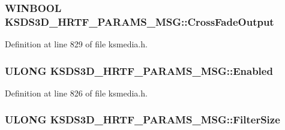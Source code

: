 \subsubsection[{\texorpdfstring{Cross\+Fade\+Output}{CrossFadeOutput}}]{\setlength{\rightskip}{0pt plus 5cm}W\+I\+N\+B\+O\+OL K\+S\+D\+S3\+D\+\_\+\+H\+R\+T\+F\+\_\+\+P\+A\+R\+A\+M\+S\+\_\+\+M\+S\+G\+::\+Cross\+Fade\+Output}\hypertarget{struct_k_s_d_s3_d___h_r_t_f___p_a_r_a_m_s___m_s_g_aa7a6adaee0ef3b1d5d509eb72c11bb55}{}\label{struct_k_s_d_s3_d___h_r_t_f___p_a_r_a_m_s___m_s_g_aa7a6adaee0ef3b1d5d509eb72c11bb55}


Definition at line 829 of file ksmedia.\+h.

\subsubsection[{\texorpdfstring{Enabled}{Enabled}}]{\setlength{\rightskip}{0pt plus 5cm}U\+L\+O\+NG K\+S\+D\+S3\+D\+\_\+\+H\+R\+T\+F\+\_\+\+P\+A\+R\+A\+M\+S\+\_\+\+M\+S\+G\+::\+Enabled}\hypertarget{struct_k_s_d_s3_d___h_r_t_f___p_a_r_a_m_s___m_s_g_ab94cf1a71d9a101c1bf2e5b0cfe6c580}{}\label{struct_k_s_d_s3_d___h_r_t_f___p_a_r_a_m_s___m_s_g_ab94cf1a71d9a101c1bf2e5b0cfe6c580}


Definition at line 826 of file ksmedia.\+h.

\subsubsection[{\texorpdfstring{Filter\+Size}{FilterSize}}]{\setlength{\rightskip}{0pt plus 5cm}U\+L\+O\+NG K\+S\+D\+S3\+D\+\_\+\+H\+R\+T\+F\+\_\+\+P\+A\+R\+A\+M\+S\+\_\+\+M\+S\+G\+::\+Filter\+Size}\hypertarget{struct_k_s_d_s3_d___h_r_t_f___p_a_r_a_m_s___m_s_g_a80cd979deddb1285ba7775aade4fd4dc}{}\label{struct_k_s_d_s3_d___h_r_t_f___p_a_r_a_m_s___m_s_g_a80cd979deddb1285ba7775aade4fd4dc}


